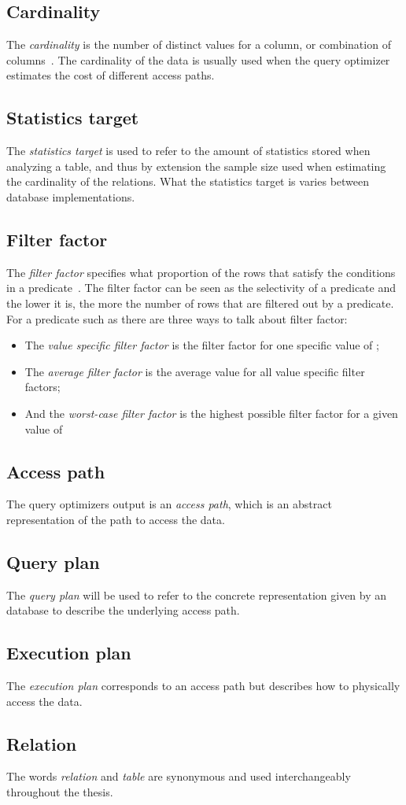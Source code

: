 \subsection*{Cardinality}
The \textit{cardinality} is the number of distinct values for a column, or
combination of columns~\cite{lahdenmaki_2005_relational_rdidatodossea}. The
cardinality of the data is usually used when the query optimizer estimates the
cost of different access paths.

\subsection*{Statistics target}
The \textit{statistics target} is used to refer to the amount of statistics
stored when analyzing a table, and thus by extension the sample size used when
estimating the cardinality of the relations. What the statistics target is
varies between database implementations.

\subsection*{Filter factor}
The \textit{filter factor} specifies what proportion of the rows that    satisfy
the conditions in a predicate~\cite{lahdenmaki_2005_relational_rdidatodossea}.
The filter factor can be seen as the selectivity of a predicate and the lower it
is, the more the number of rows that are filtered out by a predicate. For a
predicate such as  there are three ways to talk about
filter factor:
\begin{itemize}
\item The \textit{value specific filter factor} is the filter factor for one
  specific value of ;
\item The \textit{average filter factor} is the average value for all value
  specific filter factors;
\item And the \textit{worst-case filter factor} is the highest possible filter
  factor for a given value of 
\end{itemize}

\subsection*{Access path}
The query optimizers output is an \textit{access path}, which is an abstract
representation of the path to access the data.

\subsection*{Query plan}
The \textit{query plan} will be used to refer to the concrete representation
given by an database to describe the underlying access path.

\subsection*{Execution plan}
The \textit{execution plan} corresponds to an access path but describes how to
physically access the data.

\subsection*{Relation}
The words \textit{relation} and \textit{table} are synonymous and used
interchangeably throughout the thesis.